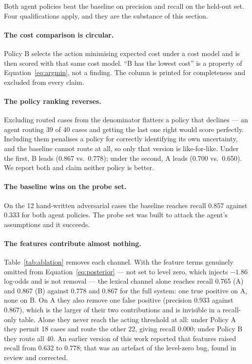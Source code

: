 \documentclass{article}
\begin{document}
Both agent policies beat the baseline on precision and recall on the held-out
set. Four qualifications apply, and they are the substance of this section.

\paragraph{The cost comparison is circular.} Policy B selects the action
minimising expected cost under a cost model and is then scored with that same
cost model. ``B has the lowest cost'' is a property of
Equation~\eqref{eq:argmin}, not a finding. The column is printed for
completeness and excluded from every claim.

\paragraph{The policy ranking reverses.} Excluding routed cases from the
denominator flatters a policy that declines --- an agent routing 39 of 40 cases
and getting the last one right would score perfectly. Including them penalises
a policy for correctly identifying its own uncertainty, and the baseline cannot
route at all, so only that version is like-for-like. Under the first, B leads
(0.867 vs.\ 0.778); under the second, A leads (0.700 vs.\ 0.650). We report
both and claim neither policy is better.

\paragraph{The baseline wins on the probe set.} On the 12 hand-written
adversarial cases the baseline reaches recall 0.857 against 0.333 for both
agent policies. The probe set was built to attack the agent's assumptions and
it succeeds.

\paragraph{The features contribute almost nothing.}
Table~\ref{tab:ablation} removes each channel. With the feature terms genuinely
omitted from Equation~\eqref{eq:posterior} --- not set to level zero, which
injects $-1.86$ log-odds and is not removal --- the lexical channel alone
reaches recall 0.765 (A) and 0.867 (B) against 0.778 and 0.867 for the full
system: one true positive on A, none on B. On A they also remove one false
positive (precision 0.933 against 0.867), which is the larger of their two
contributions and is invisible in a recall-only table. Alone they never reach
the acting threshold at all: under Policy A they permit 18 cases and route the
other 22, giving recall 0.000; under Policy B they route all 40. An earlier
version of this work
reported that features raised recall from 0.632 to 0.778; that was an artefact
of the level-zero bug, found in review and corrected.
\end{document}
